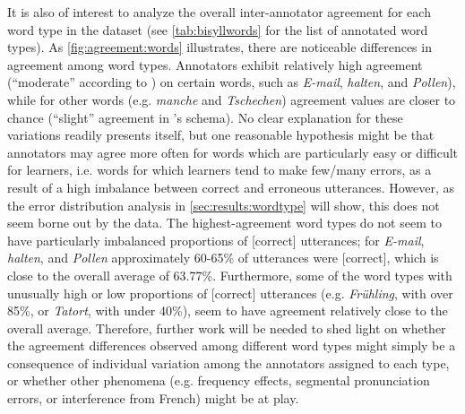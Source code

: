 		
		
		
			
		It is also of interest to analyze the overall inter-annotator agreement for each word type in the dataset (see \cref{tab:bisyllwords} for the list of annotated word types).  As \cref{fig:agreement:words} illustrates, there are noticeable differences in agreement among word types. Annotators exhibit relatively high agreement (``moderate'' according to \cite{Landis1977}) on certain words, such as \textit{E-mail}, \textit{halten}, and \textit{Pollen}), while for other words (e.g. \textit{manche} and \textit{Tschechen}) agreement values are closer to chance (``slight'' agreement in \citeauthor{Landis1977}'s schema). 
		No clear explanation for these variations readily presents itself, but one reasonable hypothesis might be that annotators may agree more often for words which are particularly easy or difficult for learners, i.e. words for which learners tend to make few/many errors, as a result of a high imbalance between correct and erroneous utterances. However, as the error distribution analysis in \cref{sec:results:wordtype} will show, this does not seem borne out by the data. The highest-agreement word types do not seem to have particularly imbalanced proportions of [correct] utterances; for \textit{E-mail}, \textit{halten}, and \textit{Pollen} approximately 60-65\% of utterances were [correct], which is close to the overall average of 63.77\%. Furthermore, some of the word types with unusually high or low proportions of [correct] utterances (e.g. \textit{Frühling}, with over 85\%, or \textit{Tatort}, with under 40\%), seem to have agreement relatively close to the overall average. Therefore, further work will be needed to shed light on whether the agreement differences observed among different word types might simply be a consequence of individual variation among the annotators assigned to each type, or whether other phenomena (e.g. frequency effects, segmental pronunciation errors, or interference from French) might be at play.
		

